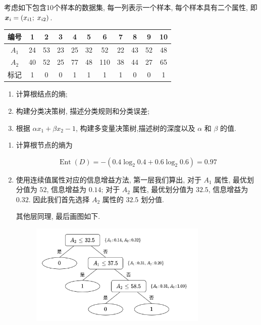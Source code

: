 \documentclass[answers]{exam}  %
\begin{document}
\begin{questions}
  考虑如下包含10个样本的数据集, 每一列表示一个样本, 每个样本具有二个属性, 即${\boldsymbol{x}}_i = (x_{i1};\; x_{i2})$.
  \begin{table}[ht]
    \begin{center}
      \begin{tabular}{ccccccccccc}
        \hline 编号  & 1  & 2  & 3  & 4  & 5  & 6   & 7  & 8  & 9  & 10 \\
        \hline $A_1$ & 24 & 53 & 23 & 25 & 32 & 52  & 22 & 43 & 52 & 48 \\
        $A_2$        & 40 & 52 & 25 & 77 & 48 & 110 & 38 & 44 & 27 & 65 \\
        \hline 标记  & 1  & 0  & 0  & 1  & 1  & 1   & 1  & 0  & 0  & 1  \\
        \hline
      \end{tabular}
    \end{center}
  \end{table}
  \begin{enumerate}
    \item 计算根结点的熵;
    \item 构建分类决策树, 描述分类规则和分类误差;
    \item 根据 $\alpha x_{1}+\beta x_{2}-1$,  构建多变量决策树,描述树的深度以及 $\alpha$ 和 $\beta$ 的值.
  \end{enumerate}
  \begin{solution}
    \begin{enumerate}
      \item

            计算根节点的熵为

            $$
              \operatorname{Ent}(D) = -(0.4\log_2 0.4 + 0.6\log_2 0.6) = 0.97
            $$

      \item

            使用连续值属性对应的信息增益方法, 第一层我们算出, 对于 $A_1$ 属性, 最优划分值为 $52$, 信息增益为 $0.14$; 对于 $A_2$ 属性, 最优划分值为 $32.5$, 信息增益为 $0.32$. 因此我们首先选择 $A_2$ 属性的 $32.5$ 划分值.

            其他层同理, 最后画图如下.

            \begin{figure}[H]
              \centering
              \includegraphics[width=0.8\textwidth]{./figure/PS3-5-2.png}
              \label{Fig.main1}
            \end{figure}


\end{enumerate}
\end{solution}
\end{questions}
\end{document}
